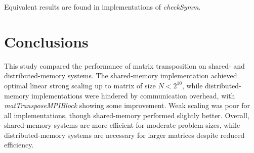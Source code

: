 \documentclass[conference]{IEEEtran}
\begin{document}
Equivalent results are found in implementations of \textit{checkSymm}.

\section{Conclusions}

This study compared the performance of matrix transposition on
shared- and distributed-memory systems. The shared-memory implementation
achieved optimal linear strong scaling up to matrix of size $N<2^{10}$, while distributed-memory
implementations were hindered by communication overhead, with
\textit{matTransposeMPIBlock} showing some improvement. Weak scaling
was poor for all implementations, though shared-memory performed
slightly better. Overall, shared-memory systems are more efficient
for moderate problem sizes, while distributed-memory systems are
necessary for larger matrices despite reduced efficiency.
\end{document}
